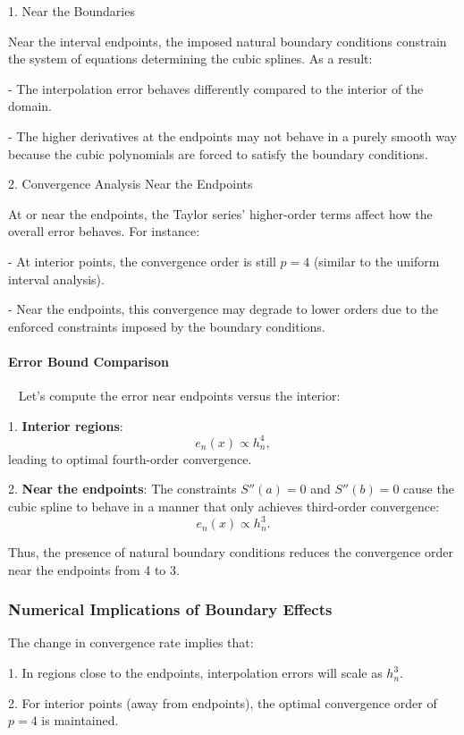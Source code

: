 \documentclass{article}
\begin{document}
1. Near the Boundaries\par
Near the interval endpoints, the imposed natural boundary conditions constrain the system of equations determining the cubic splines. As a result:\par
- The interpolation error behaves differently compared to the interior of the domain.\par
- The higher derivatives at the endpoints may not behave in a purely smooth way because the cubic polynomials are forced to satisfy the boundary conditions.\par

2. Convergence Analysis Near the Endpoints\par
At or near the endpoints, the Taylor series' higher-order terms affect how the overall error behaves. For instance:\par
- At interior points, the convergence order is still \( p=4 \) (similar to the uniform interval analysis).\par
- Near the endpoints, this convergence may degrade to lower orders due to the enforced constraints imposed by the boundary conditions.

\paragraph{\textbf{Error Bound Comparison}}~{}\newline
Let's compute the error near endpoints versus the interior:

1. \textbf{Interior regions}:
   \[
   e_n(x) \propto h_n^4,
   \]
   leading to optimal fourth-order convergence.

2. \textbf{Near the endpoints}:
   The constraints \( S''(a) = 0 \) and \( S''(b) = 0 \) cause the cubic spline to behave in a manner that only achieves third-order convergence:
   \[
   e_n(x) \propto h_n^3.
   \]

Thus, the presence of natural boundary conditions reduces the convergence order near the endpoints from 4 to 3.

\subsubsection{Numerical Implications of Boundary Effects}
The change in convergence rate implies that:\par
1. In regions close to the endpoints, interpolation errors will scale as \( h_n^3 \).\par
2. For interior points (away from endpoints), the optimal convergence order of \( p=4 \) is maintained.
\end{document}
